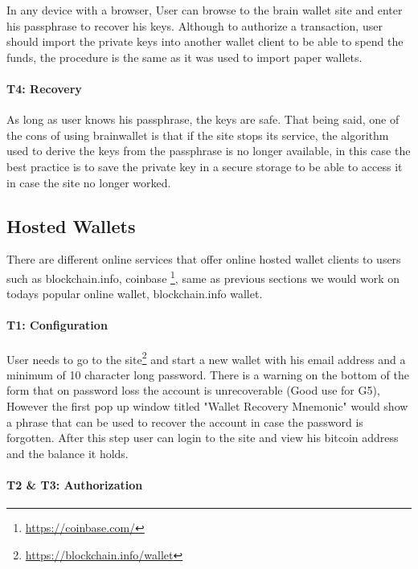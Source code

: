 In any device with a browser, User can browse to the brain wallet site and enter his passphrase to recover his keys. Although to authorize a transaction, user should import the private keys into another wallet client to be able to spend the funds, the procedure is the same as it was used to import paper wallets.

\paragraph{T4: Recovery} 

As long as user knows his passphrase, the keys are safe. That being said, one of the cons of using brainwallet is that if the site stops its service, the algorithm used to derive the keys from the passphrase is no longer available, in this case the best practice is to save the private key in a secure storage to be able to access it in case the site no longer worked.


\subsection{Hosted Wallets}
\label{hosted}
There are different online services that offer online hosted wallet clients to users such as blockchain.info, coinbase \footnote{\url{https://coinbase.com/}}, same as previous sections we would work on todays popular online wallet, blockchain.info wallet.

\paragraph{T1: Configuration} 

User needs to go to the site\footnote{\url{https://blockchain.info/wallet}} and start a new wallet with his email address and a minimum of 10 character long password. There is a warning on the bottom of the form that on password loss the account is unrecoverable (Good use for G5), However the first pop up window titled "Wallet Recovery Mnemonic" would show a phrase that can be used to recover the account in case the password is forgotten. After this step user can login to the site and view his bitcoin address and the balance it holds.

\paragraph{T2 \& T3: Authorization}
\label{hosted transaction}

